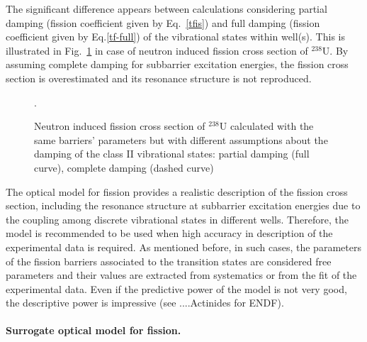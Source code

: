 The significant difference appears between calculations considering partial
damping (fission coefficient given by Eq.~\ref{tfis}) and full damping
(fission coefficient given by Eq.\ref{tf-full}) of the vibrational states
within well(s). This is illustrated in Fig.~\ref{fis-u38-fcom} in case of
neutron induced fission cross section of $^{238}$U. By assuming complete
damping for subbarrier excitation energies, the fission cross section is
overestimated and its resonance structure is not reproduced. 
\begin{figure}[htbp]
 .
\caption{Neutron induced fission cross section of $^{238}$U calculated with
the same barriers' parameters but with different assumptions about the
damping of the class II vibrational states: partial damping (full curve),
complete damping (dashed curve)}
\label{fis-u38-fcom}
\end{figure}

The optical model for fission provides a realistic description of the
fission cross section, including the resonance structure at subbarrier
excitation energies due to the coupling among discrete vibrational states in
different wells. Therefore, the model is recommended to be used when high
accuracy in description of the experimental data is required. As mentioned
before, in such cases, the parameters of the fission barriers associated to
the transition states are considered free parameters and their values are
extracted from systematics or from the fit of the experimental data. Even if
the predictive power of the model is not very good, the descriptive power is
impressive (see ....Actinides for ENDF).

\medskip %

\paragraph*{Surrogate optical model for fission.}

